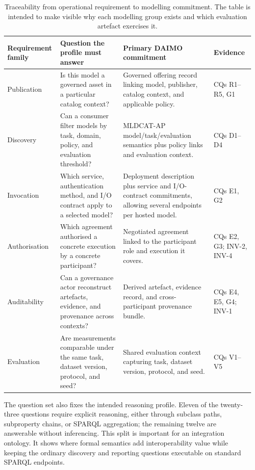\documentclass[Afour,sagev,times]{sagej}
\begin{document}
\begin{table}[t]
\small\sf\centering
\caption{Traceability from operational requirement to modelling commitment. The table is intended to make visible why each modelling group exists and which evaluation artefact exercises it.\label{tab:req-trace}}
\begin{tabular}{@{}p{3.2cm}p{4.3cm}p{4.2cm}p{2.8cm}@{}}
\toprule
\textbf{Requirement family} & \textbf{Question the profile must answer} & \textbf{Primary DAIMO commitment} & \textbf{Evidence} \\
\midrule
Publication & Is this model a governed asset in a particular catalog context? & Governed offering record linking model, publisher, catalog context, and applicable policy. & CQs R1--R5, G1 \\
Discovery & Can a consumer filter models by task, domain, policy, and evaluation threshold? & MLDCAT-AP model/task/evaluation semantics plus policy links and evaluation context. & CQs D1--D4 \\
Invocation & Which service, authentication method, and I/O contract apply to a selected model? & Deployment description plus service and I/O-contract commitments, allowing several endpoints per hosted model. & CQs E1, G2 \\
Authorisation & Which agreement authorised a concrete execution by a concrete participant? & Negotiated agreement linked to the participant role and execution it covers. & CQs E2, G3; INV-2, INV-4 \\
Auditability & Can a governance actor reconstruct artefacts, evidence, and provenance across contexts? & Derived artefact, evidence record, and cross-participant provenance bundle. & CQs E4, E5, G4; INV-1 \\
Evaluation & Are measurements comparable under the same task, dataset version, protocol, and seed? & Shared evaluation context capturing task, dataset version, protocol, and seed. & CQs V1--V5 \\
\bottomrule
\end{tabular}
\end{table}

The question set also fixes the intended reasoning profile. Eleven of the twenty-three questions require explicit reasoning, either through subclass paths, subproperty chains, or SPARQL aggregation; the remaining twelve are answerable without inferencing. This split is important for an integration ontology. It shows where formal semantics add interoperability value while keeping the ordinary discovery and reporting questions executable on standard SPARQL endpoints.
\end{document}
